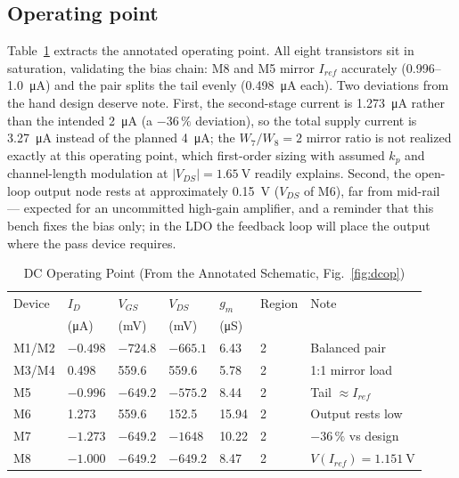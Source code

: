 \documentclass[conference]{IEEEtran}
\begin{document}
\subsection{Operating point}
Table~\ref{tab:dcop} extracts the annotated operating point. All eight
transistors sit in saturation, validating the bias chain: M8 and M5 mirror
$I_{ref}$ accurately (0.996--1.0~\si{\micro\ampere}) and the pair splits the
tail evenly (\SI{0.498}{\micro\ampere} each). Two deviations from the hand
design deserve note. First, the second-stage current is
\SI{1.273}{\micro\ampere} rather than the intended \SI{2}{\micro\ampere} (a
$-36\,\%$ deviation), so the total supply current is \SI{3.27}{\micro\ampere}
instead of the planned \SI{4}{\micro\ampere}; the $W_7/W_8=2$ mirror ratio is
not realized exactly at this operating point, which first-order sizing with
assumed $k_p$ and channel-length modulation at $|V_{DS}|=\SI{1.65}{\volt}$
readily explains. Second, the open-loop output node rests at approximately
\SI{0.15}{\volt} ($V_{DS}$ of M6), far from mid-rail --- expected for an
uncommitted high-gain amplifier, and a reminder that this bench fixes the
bias only; in the LDO the feedback loop will place the output where the pass
device requires.

\begin{table}[!t]
\caption{DC Operating Point (From the Annotated Schematic, Fig.~\ref{fig:dcop})}
\label{tab:dcop}
\centering\footnotesize
\begin{tabular}{@{}lllllll@{}}
\toprule
Device & $I_D$ & $V_{GS}$ & $V_{DS}$ & $g_m$ & Region & Note \\
 & (\si{\micro\ampere}) & (mV) & (mV) & (\si{\micro\siemens}) & & \\
\midrule
M1/M2 & $-0.498$ & $-724.8$ & $-665.1$ & 6.43 & 2 & Balanced pair \\
M3/M4 & 0.498 & 559.6 & 559.6 & 5.78 & 2 & 1:1 mirror load \\
M5 & $-0.996$ & $-649.2$ & $-575.2$ & 8.44 & 2 & Tail $\approx I_{ref}$ \\
M6 & 1.273 & 559.6 & 152.5 & 15.94 & 2 & Output rests low \\
M7 & $-1.273$ & $-649.2$ & $-1648$ & 10.22 & 2 & $-36\,\%$ vs design \\
M8 & $-1.000$ & $-649.2$ & $-649.2$ & 8.47 & 2 & $V(I_{ref})=\SI{1.151}{\volt}$ \\
\bottomrule
\end{tabular}
\end{table}
\end{document}

